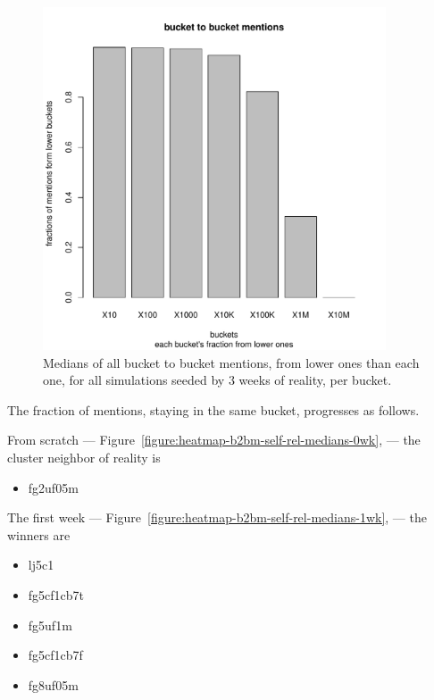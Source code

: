 \documentclass[10pt,oneside]{memoir}
\begin{document}
\begin{Spacing}{2}
\begin{figure}
\begin{center}
    \includegraphics[width=4in]{figures/b2bm-aftr-rel-medians-med}
    \caption{Medians of all bucket to bucket mentions, from lower ones than each one, for all simulations seeded by 3 weeks of reality, per bucket.}
    \label{figure:b2bm-aftr-rel-medians-med}
\end{center}
\end{figure}
The fraction of mentions, staying in the same bucket, progresses as follows.


From scratch --- Figure~\ref{figure:heatmap-b2bm-self-rel-medians-0wk}, --- the cluster neighbor of reality is


\begin{itemize}


\item fg2uf05m
\end{itemize}

The first week --- Figure~\ref{figure:heatmap-b2bm-self-rel-medians-1wk}, --- the winners are


\begin{itemize}


\item lj5c1

\item fg5cf1cb7t

\item fg5uf1m

\item fg5cf1cb7f

\item fg8uf05m


\end{itemize}
\end{Spacing}
\end{document}

